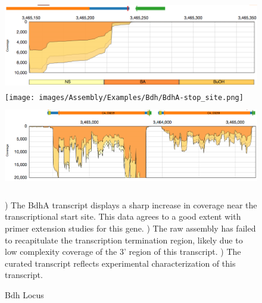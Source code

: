 \begin{figure}
{\includegraphics[width=\textwidth,height=1.5in]{images/Assembly/Examples/Bdh/BdhA-TSS.png}
\label{fig:5a}}
{\texttt{[image: images/Assembly/Examples/Bdh/BdhA-stop\_site.png]}
\label{fig:5b}}
{\includegraphics[width=\textwidth,height=1.5in]{images/Assembly/Examples/Bdh/Bdh-curated.png}
\label{fig:5c}}
\caption{Bdh Locus}
) The BdhA transcript displays a sharp increase in coverage near the transcriptional start site. This data agrees to a good extent with primer extension studies for this gene. ) The raw assembly has failed to recapitulate the transcription termination region, likely due to low complexity coverage of the 3' region of this transcript. ) The curated transcript reflects experimental characterization of this transcript\cite{72}.
\end{figure}

